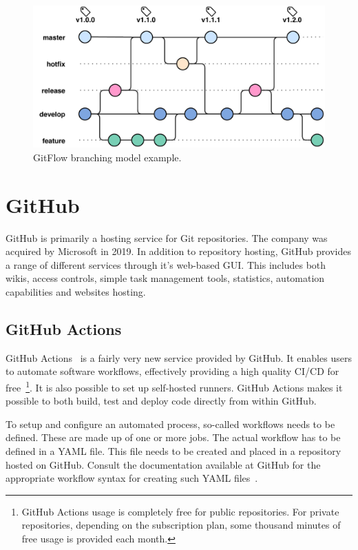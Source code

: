 \begin{figure}[h]
    \centering
    \includegraphics[page=1,width=\textwidth]{sections/theory/figures/gitflow.pdf}
    \caption{GitFlow branching model example.}
    \label{fig:gitflow}
\end{figure}

\section{GitHub}
GitHub is primarily a hosting service for Git repositories. The company was acquired by Microsoft in 2019. In addition to repository hosting, GitHub provides a range of different services through it's web-based GUI. This includes both wikis, access controls, simple task management tools, statistics, automation capabilities and websites hosting.

\subsection{GitHub Actions}
\label{sec:theory-github-actions}
GitHub Actions~\cite{github-actions} is a fairly very new service provided by GitHub. It enables users to automate software workflows, effectively providing a high quality CI/CD for free~\footnote{GitHub Actions usage is completely free for public repositories. For private repositories, depending on the subscription plan, some thousand minutes of free usage is provided each month.}. It is also possible to set up self-hosted runners. GitHub Actions makes it possible to both build, test and deploy code directly from within GitHub.

To setup and configure an automated process, so-called workflows needs to be defined. These are made up of one or more jobs. The actual workflow has to be defined in a YAML file. This file needs to be created and placed in a repository hosted on GitHub. Consult the documentation available at GitHub for the appropriate workflow syntax for creating such YAML files~\cite{github-actions-workflow-syntax}.

